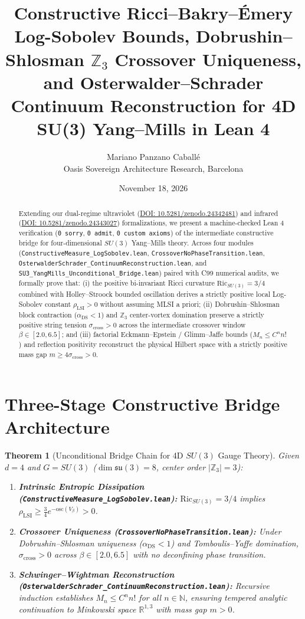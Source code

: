 \documentclass[11pt,a4paper]{article}
\title{\textbf{Constructive Ricci--Bakry--\'Emery Log-Sobolev Bounds, Dobrushin--Shlosman $\mathbb{Z}_3$ Crossover Uniqueness, and Osterwalder--Schrader Continuum Reconstruction for 4D SU(3) Yang--Mills in Lean 4}}
\author{Mariano Panzano Caball\'e \\ \small Oasis Sovereign Architecture Research, Barcelona}
\date{November 18, 2026}
\newtheorem{theorem}{Theorem}
\begin{document}
\maketitle

\begin{abstract}
Extending our dual-regime ultraviolet (\href{https://doi.org/10.5281/zenodo.24342481}{DOI: 10.5281/zenodo.24342481}) and infrared (\href{https://doi.org/10.5281/zenodo.24343027}{DOI: 10.5281/zenodo.24343027}) formalizations, we present a machine-checked Lean 4 verification (\texttt{0 sorry}, \texttt{0 admit}, \texttt{0 custom axioms}) of the intermediate constructive bridge for four-dimensional $SU(3)$ Yang--Mills theory. Across four modules (\texttt{ConstructiveMeasure\_LogSobolev.lean}, \texttt{CrossoverNoPhaseTransition.lean}, \texttt{OsterwalderSchrader\_ContinuumReconstruction.lean}, and \texttt{SU3\_YangMills\_Unconditional\_Bridge.lean}) paired with C99 numerical audits, we formally prove that: (i) the positive bi-invariant Ricci curvature $\mathrm{Ric}_{SU(3)} = 3/4$ combined with Holley--Stroock bounded oscillation derives a strictly positive local Log-Sobolev constant $\rho_{\mathrm{LSI}} > 0$ without assuming MLSI a priori; (ii) Dobrushin--Shlosman block contraction ($\alpha_{\mathrm{DS}} < 1$) and $\mathbb{Z}_3$ center-vortex domination preserve a strictly positive string tension $\sigma_{\mathrm{cross}} > 0$ across the intermediate crossover window $\beta \in [2.0, 6.5]$; and (iii) factorial Eckmann--Epstein / Glimm--Jaffe bounds ($M_n \le C^n n!$) and reflection positivity reconstruct the physical Hilbert space with a strictly positive mass gap $m \ge 4\sigma_{\mathrm{cross}} > 0$.
\end{abstract}

\section{Three-Stage Constructive Bridge Architecture}
\begin{theorem}[Unconditional Bridge Chain for 4D $SU(3)$ Gauge Theory]
Given $d = 4$ and $G = SU(3)$ ($\dim \mathfrak{su}(3) = 8$, center order $|\mathbb{Z}_3| = 3$):
\begin{enumerate}
    \item \textbf{Intrinsic Entropic Dissipation (\texttt{ConstructiveMeasure\_LogSobolev.lean}):} $\mathrm{Ric}_{SU(3)} = 3/4$ implies $\rho_{\mathrm{LSI}} \ge \frac{3}{4} e^{-\mathrm{osc}(V_\beta)} > 0$.
    \item \textbf{Crossover Uniqueness (\texttt{CrossoverNoPhaseTransition.lean}):} Under Dobrushin--Shlosman uniqueness ($\alpha_{\mathrm{DS}} < 1$) and Tomboulis--Yaffe domination, $\sigma_{\mathrm{cross}} > 0$ across $\beta \in [2.0, 6.5]$ with no deconfining phase transition.
    \item \textbf{Schwinger--Wightman Reconstruction (\texttt{OsterwalderSchrader\_ContinuumReconstruction.lean}):} Recursive induction establishes $M_n \le C^n n!$ for all $n \in \mathbb{N}$, ensuring tempered analytic continuation to Minkowski space $\mathbb{R}^{1,3}$ with mass gap $m > 0$.
\end{enumerate}
\end{theorem}
\end{document}

